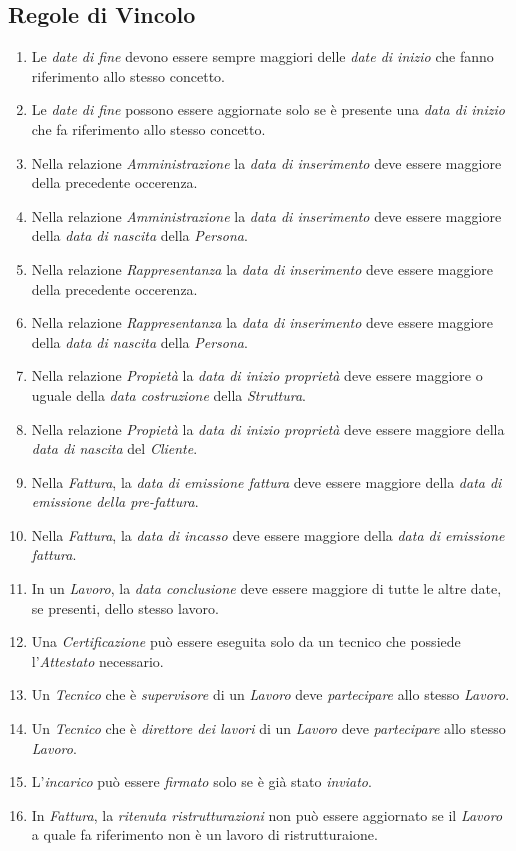 \documentclass{elegantbook}
\begin{document}
        \subsection{Regole di Vincolo}
        \begin{enumerate}[label=RV\arabic*]
            \item Le \textit{date di fine} devono essere sempre maggiori delle \textit{date di inizio} che fanno riferimento allo stesso concetto.
            \item Le \textit{date di fine} possono essere aggiornate solo se è presente una \textit{data di inizio} che fa riferimento allo stesso concetto.
            \item Nella relazione \textit{Amministrazione} la \textit{data di inserimento} deve essere maggiore della precedente occerenza.
            \item Nella relazione \textit{Amministrazione} la \textit{data di inserimento} deve essere maggiore della \textit{data di nascita} della \textit{Persona}.
            \item Nella relazione \textit{Rappresentanza} la \textit{data di inserimento} deve essere maggiore della precedente occerenza.
            \item Nella relazione \textit{Rappresentanza} la \textit{data di inserimento} deve essere maggiore della \textit{data di nascita} della \textit{Persona}.
            \item Nella relazione \textit{Propietà} la \textit{data di inizio proprietà} deve essere maggiore o uguale della \textit{data costruzione} della \textit{Struttura}.
            \item Nella relazione \textit{Propietà} la \textit{data di inizio proprietà} deve essere maggiore della \textit{data di nascita} del \textit{Cliente}. 
            \item Nella \textit{Fattura}, la \textit{data di emissione fattura} deve essere maggiore della \textit{data di emissione della pre-fattura}.
            \item Nella \textit{Fattura}, la \textit{data di incasso} deve essere maggiore della \textit{data di emissione fattura}.
            \item In un \textit{Lavoro}, la \textit{data conclusione} deve essere maggiore di tutte le altre date, se presenti, dello stesso lavoro.
            \item Una \textit{Certificazione} può essere eseguita solo da un tecnico che possiede l'\textit{Attestato} necessario.
            \item Un \textit{Tecnico} che è \textit{supervisore} di un \textit{Lavoro} deve \textit{partecipare} allo stesso \textit{Lavoro}.
            \item Un \textit{Tecnico} che è \textit{direttore dei lavori} di un \textit{Lavoro} deve \textit{partecipare} allo stesso \textit{Lavoro}.
            \item L'\textit{incarico} può essere \textit{firmato} solo se è già stato \textit{inviato}.
            \item In \textit{Fattura}, la \textit{ritenuta ristrutturazioni} non può essere aggiornato se il \textit{Lavoro} a quale fa riferimento non è un lavoro di ristrutturaione.
        \end{enumerate}
\end{document}
